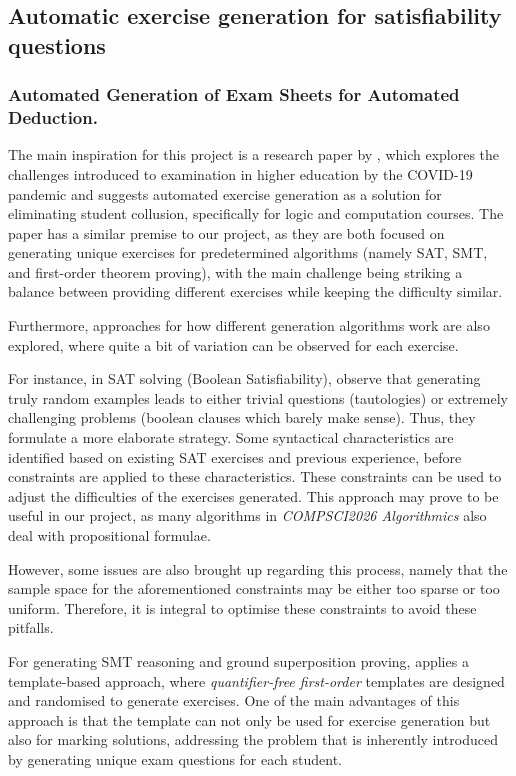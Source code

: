 \documentclass{l4proj}
\begin{document}
\subsection{Automatic exercise generation for satisfiability questions}
\subsubsection{Automated Generation of Exam Sheets for Automated Deduction.}

The main inspiration for this project is a research paper by \citet{Hoz21}, which explores the challenges introduced to examination in higher education by the COVID-19 pandemic and suggests automated exercise generation as a solution for eliminating student collusion, specifically for logic and computation courses. The paper has a similar premise to our project, as they are both focused on generating unique exercises for predetermined algorithms (namely SAT, SMT, and first-order theorem proving), with the main challenge being striking a balance between providing different exercises while keeping the difficulty similar. 

Furthermore, approaches for how different generation algorithms work are also explored, where quite a bit of variation can be observed for each exercise. 

For instance, in SAT solving (Boolean Satisfiability), \citet{Hoz21} observe that generating truly random examples leads to either trivial questions (tautologies) or extremely challenging problems (boolean clauses which barely make sense). Thus, they formulate a more elaborate strategy. Some syntactical characteristics are identified based on existing SAT exercises and previous experience, before constraints are applied to these characteristics. These constraints can be used to adjust the difficulties of the exercises generated. This approach may prove to be useful in our project, as many algorithms in \emph{COMPSCI2026 Algorithmics} also deal with propositional formulae. 

However, some issues are also brought up regarding this process, namely that the sample space for the aforementioned constraints may be either too sparse or too uniform. Therefore, it is integral to optimise these constraints to avoid these pitfalls. 

For generating SMT reasoning and ground superposition proving, \citet{Hoz21} applies a template-based approach, where \emph{quantifier-free first-order} templates are designed and randomised to generate exercises. One of the main advantages of this approach is that the template can not only be used for exercise generation but also for marking solutions, addressing the problem that is inherently introduced by generating unique exam questions for each student. 
\end{document}
